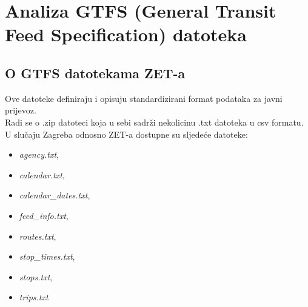 \documentclass[times, utf8, diplomski]{fer}
\begin{document}
\chapter{Analiza GTFS (General Transit Feed Specification) datoteka}
\section{O GTFS datotekama ZET-a}
Ove datoteke definiraju i opisuju standardizirani format podataka za javni prijevoz.\\
Radi se o .zip datoteci koja u sebi sadrži nekolicinu .txt datoteka u csv formatu. U slučaju Zagreba odnosno ZET-a dostupne su sljedeće datoteke:\\
\begin{itemize}
    \item \emph{agency.txt},
    \item \emph{calendar.txt},
    \item \emph{calendar\_dates.txt},
    \item \emph{feed\_info.txt},
    \item \emph{routes.txt},
    \item \emph{stop\_times.txt},
    \item \emph{stops.txt},
    \item \emph{trips.txt}
\end{itemize}
\end{document}
